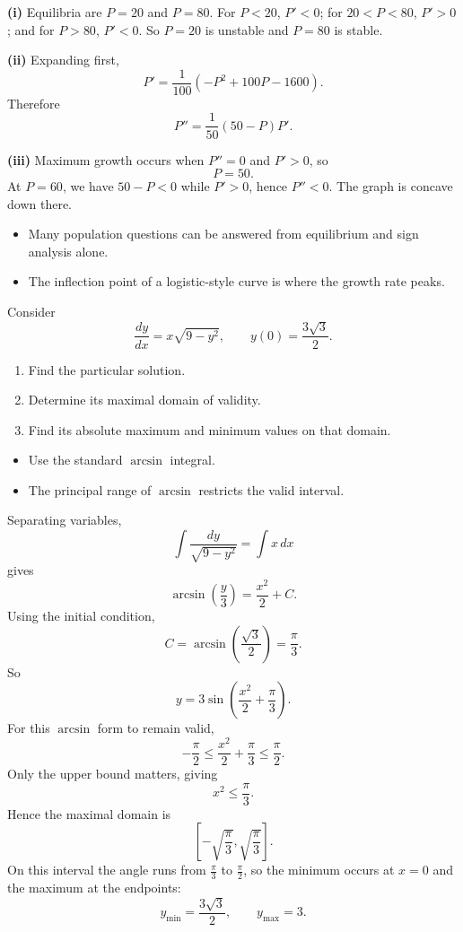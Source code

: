 \begin{solution}
\textbf{(i)} Equilibria are $P=20$ and $P=80$. For $P<20$, $P'<0$; for $20<P<80$, $P'>0$; and for $P>80$, $P'<0$. So $P=20$ is unstable and $P=80$ is stable.

\textbf{(ii)} Expanding first,
\[
P'=\frac1{100}(-P^2+100P-1600).
\]
Therefore
\[
\boxed{P''=\frac1{50}(50-P)P'}.
\]

\textbf{(iii)} Maximum growth occurs when $P''=0$ and $P'>0$, so
\[
\boxed{P=50}.
\]
At $P=60$, we have $50-P<0$ while $P'>0$, hence $P''<0$. The graph is concave down there.
\end{solution}

\begin{takeaways}
\begin{itemize}[leftmargin=*]
    \item Many population questions can be answered from equilibrium and sign analysis alone.
    \item The inflection point of a logistic-style curve is where the growth rate peaks.
\end{itemize}
\end{takeaways}

\begin{problem}
Consider
\[
\frac{dy}{dx}=x\sqrt{9-y^2},\qquad y(0)=\frac{3\sqrt3}{2}.
\]
\begin{enumerate}
    \item[\textbf{i}] Find the particular solution.
    \item[\textbf{ii}] Determine its maximal domain of validity.
    \item[\textbf{iii}] Find its absolute maximum and minimum values on that domain.
\end{enumerate}
\end{problem}

\begin{hint}
\begin{itemize}[leftmargin=*]
    \item Use the standard $\arcsin$ integral.
    \item The principal range of $\arcsin$ restricts the valid interval.
\end{itemize}
\end{hint}

\begin{solution}
Separating variables,
\[
\int\frac{dy}{\sqrt{9-y^2}}=\int x\,dx
\]
gives
\[
\arcsin\left(\frac{y}{3}\right)=\frac{x^2}{2}+C.
\]
Using the initial condition,
\[
C=\arcsin\left(\frac{\sqrt3}{2}\right)=\frac{\pi}{3}.
\]
So
\[
\boxed{y=3\sin\left(\frac{x^2}{2}+\frac{\pi}{3}\right)}.
\]
For this $\arcsin$ form to remain valid,
\[
-\frac{\pi}{2}\le \frac{x^2}{2}+\frac{\pi}{3}\le \frac{\pi}{2}.
\]
Only the upper bound matters, giving
\[
x^2\le \frac{\pi}{3}.
\]
Hence the maximal domain is
\[
\boxed{\left[-\sqrt{\frac{\pi}{3}},\sqrt{\frac{\pi}{3}}\right]}.
\]
On this interval the angle runs from $\frac{\pi}{3}$ to $\frac{\pi}{2}$, so the minimum occurs at $x=0$ and the maximum at the endpoints:
\[
\boxed{y_{\min}=\frac{3\sqrt3}{2},\qquad y_{\max}=3.}
\]
\end{solution}

